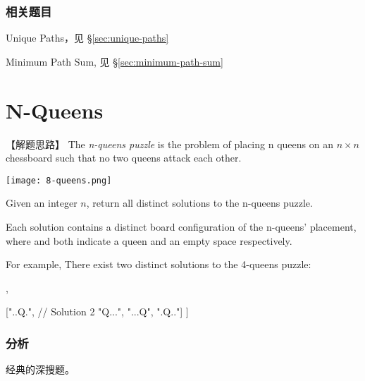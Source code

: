 \subsubsection{相关题目}
\begindot
\item Unique Paths，见 \S \ref{sec:unique-paths}
\item Minimum Path Sum, 见 \S \ref{sec:minimum-path-sum}
\myenddot


\section{N-Queens} %
\label{sec:n-queens}


【解题思路】
The \emph{n-queens puzzle} is the problem of placing n queens on an $n \times n$ chessboard such that no two queens attack each other.

\begin{center}
	\texttt{[image: 8-queens.png]}\\
	\label{fig:8-queens}
\end{center}

Given an integer $n$, return all distinct solutions to the n-queens puzzle.

Each solution contains a distinct board configuration of the n-queens' placement, where  and  both indicate a queen and an empty space respectively.

For example,
There exist two distinct solutions to the 4-queens puzzle:
\begin{Code}
	[
	[".Q..",  // Solution 1
	"...Q",
	"Q...",
	"..Q."],
	
	["..Q.",  // Solution 2
	"Q...",
	"...Q",
	".Q.."]
	]
\end{Code}


\subsubsection{分析}
经典的深搜题。

